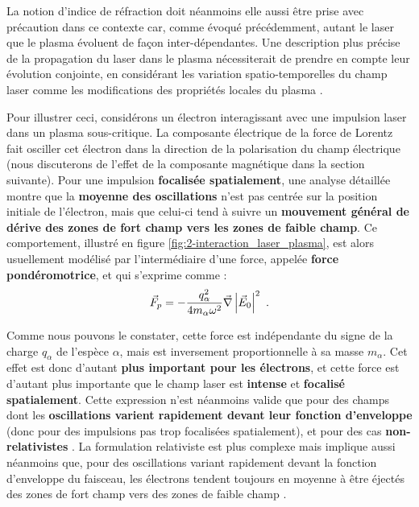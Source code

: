 \begin{refsection}
La notion d'indice de réfraction doit néanmoins elle aussi être prise avec précaution dans ce contexte car, comme évoqué précédemment, autant le laser que le plasma évoluent de façon inter-dépendantes. Une description plus précise de la propagation du laser dans le plasma nécessiterait de prendre en compte leur évolution conjointe, en considérant les variation spatio-temporelles du champ laser comme les modifications des propriétés locales du plasma \parencite{macchi_2012}.

Pour illustrer ceci, considérons un électron interagissant avec une impulsion laser dans un plasma sous-critique. La composante électrique de la force de Lorentz fait osciller cet électron dans la direction de la polarisation du champ électrique (nous discuterons de l'effet de la composante magnétique dans la section suivante). Pour une impulsion \textbf{focalisée spatialement}, une analyse détaillée \parencite{macchi_2012} montre que la \textbf{moyenne des oscillations} n'est pas centrée sur la position initiale de l'électron, mais que celui-ci tend à suivre un \textbf{mouvement général de dérive des zones de fort champ vers les zones de faible champ}. Ce comportement, illustré en figure \ref{fig:2-interaction_laser_plasma}, est alors usuellement modélisé par l'intermédiaire d'une force, appelée \textbf{force pondéromotrice}, et qui s'exprime comme \parencite{macchi_2012} :
\begin{equation}
    \vec{F}_p=-\dfrac{q_\alpha^2}{4 m_\alpha \omega^2} \vec{\nabla} \left|\vec{E}_0\right|^2 ~ \rm.
\end{equation}

Comme nous pouvons le constater, cette force est indépendante du signe de la charge $q_\alpha$ de l'espèce $\alpha$, mais est inversement proportionnelle à sa masse $m_\alpha$. Cet effet est donc d'autant \textbf{plus important pour les électrons}, et cette force est d'autant plus importante que le champ laser est \textbf{intense} et \textbf{focalisé spatialement}. Cette expression n'est néanmoins valide que pour des champs dont les \textbf{oscillations varient rapidement devant leur fonction d'enveloppe} (donc pour des impulsions pas trop focalisées spatialement), et pour des cas \textbf{non-relativistes} \parencite{macchi_2012}. La formulation relativiste est plus complexe mais implique aussi néanmoins que, pour des oscillations variant rapidement devant la fonction d'enveloppe du faisceau, les électrons tendent toujours en moyenne à être éjectés des zones de fort champ vers des zones de faible champ \parencite{yang_2011}. 


\end{refsection}
